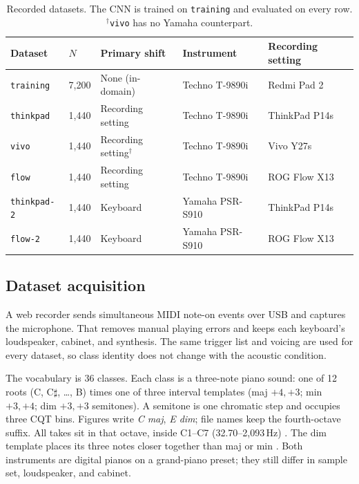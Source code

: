 \documentclass[pdflatex,sn-mathphys-num,iicol]{sn-jnl}
\begin{document}
\begin{table}[t]
\caption{Recorded datasets. The CNN is trained on \texttt{training} and evaluated on every row. $^\dagger$\texttt{vivo} has no Yamaha counterpart.}\label{tab_datasets}
\begin{tabular*}{\textwidth}{@{\extracolsep{\fill}}lllll@{}}
\toprule
Dataset & $N$ & Primary shift & Instrument & Recording setting \\
\midrule
\texttt{training} & 7{,}200 & None (in-domain) & Techno T-9890i & Redmi Pad 2 \\
\texttt{thinkpad} & 1{,}440 & Recording setting & Techno T-9890i & ThinkPad P14s \\
\texttt{vivo} & 1{,}440 & Recording setting$^\dagger$ & Techno T-9890i & Vivo Y27s \\
\texttt{flow} & 1{,}440 & Recording setting & Techno T-9890i & ROG Flow X13 \\
\texttt{thinkpad-2} & 1{,}440 & Keyboard & Yamaha PSR-S910 & ThinkPad P14s \\
\texttt{flow-2} & 1{,}440 & Keyboard & Yamaha PSR-S910 & ROG Flow X13 \\
\bottomrule
\end{tabular*}
\end{table}

\subsection{Dataset acquisition}\label{subsec_acquisition}

A web recorder sends simultaneous MIDI note-on events over USB and captures the microphone. That removes manual playing errors and keeps each keyboard's loudspeaker, cabinet, and synthesis. The same trigger list and voicing are used for every dataset, so class identity does not change with the acoustic condition.

The vocabulary is 36 classes. Each class is a three-note piano sound: one of 12 roots (C, C$\sharp$, \ldots, B) times one of three interval templates (maj $+4,+3$; min $+3,+4$; dim $+3,+3$ semitones). A semitone is one chromatic step and occupies three CQT bins. Figures write \emph{C maj}, \emph{E dim}; file names keep the fourth-octave suffix. All takes sit in that octave, inside C1--C7 (32.70--2{,}093\,Hz) \cite{Telila2023,Harte2010}. The dim template places its three notes closer together than maj or min \cite{Byambatsogt2020}. Both instruments are digital pianos on a grand-piano preset; they still differ in sample set, loudspeaker, and cabinet.
\end{document}
